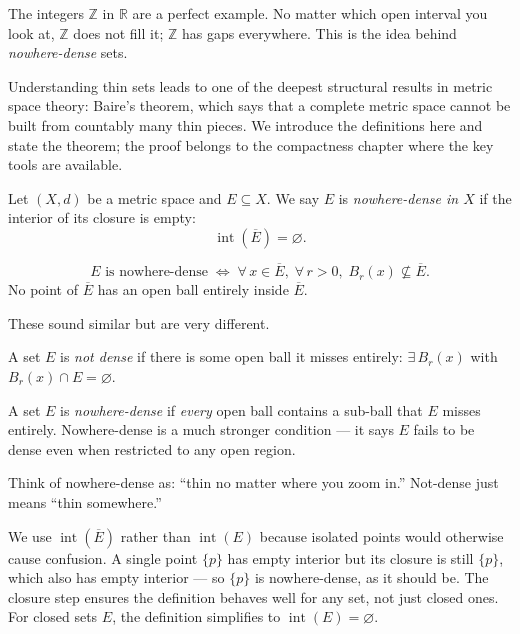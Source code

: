 The integers $\mathbb{Z}$ in $\mathbb{R}$ are a perfect example.
No matter which open interval you look at, $\mathbb{Z}$ does not
fill it; $\mathbb{Z}$ has gaps everywhere.
This is the idea behind \emph{nowhere-dense} sets.

Understanding thin sets leads to one of the deepest structural results
in metric space theory: Baire's theorem, which says that a complete
metric space cannot be built from countably many thin pieces.
We introduce the definitions here and state the theorem;
the proof belongs to the compactness chapter where the key tools are available.

\begin{tcolorbox}[colback=defbox, colframe=defborder, arc=2pt,
  left=6pt, right=6pt, top=4pt, bottom=4pt,
  title={\small\textbf{Definition (Nowhere-Dense)}},
  fonttitle=\small\bfseries]
\begin{definition}
\label{def:nowhere-dense}
Let $(X,d)$ be a metric space and $E \subseteq X$.
We say $E$ is \emph{nowhere-dense in $X$} if the interior of its closure
is empty:
\[
\operatorname{int}(\overline{E}) = \varnothing.
\]
\end{definition}
\end{tcolorbox}

\begin{remark*}
\[
E \text{ is nowhere-dense}
\;\iff\;
\forall\, x \in \overline{E},\; \forall\, r > 0,\;
B_r(x) \not\subseteq \overline{E}.
\]
No point of $\overline{E}$ has an open ball entirely inside $\overline{E}$.
\end{remark*}

\begin{remark*}
These sound similar but are very different.

A set $E$ is \emph{not dense} if there is some open ball it misses entirely:
$\exists\, B_r(x)$ with $B_r(x) \cap E = \varnothing$.

A set $E$ is \emph{nowhere-dense} if \emph{every} open ball contains a
sub-ball that $E$ misses entirely.
Nowhere-dense is a much stronger condition --- it says $E$ fails to be
dense even when restricted to any open region.

Think of nowhere-dense as: ``thin no matter where you zoom in.''
Not-dense just means ``thin somewhere.''
\end{remark*}

\begin{remark*}
We use $\operatorname{int}(\overline{E})$ rather than $\operatorname{int}(E)$
because isolated points would otherwise cause confusion.
A single point $\{p\}$ has empty interior but its closure is still $\{p\}$,
which also has empty interior --- so $\{p\}$ is nowhere-dense, as it should be.
The closure step ensures the definition behaves well for any set,
not just closed ones.
For closed sets $E$, the definition simplifies to
$\operatorname{int}(E) = \varnothing$.
\end{remark*}

